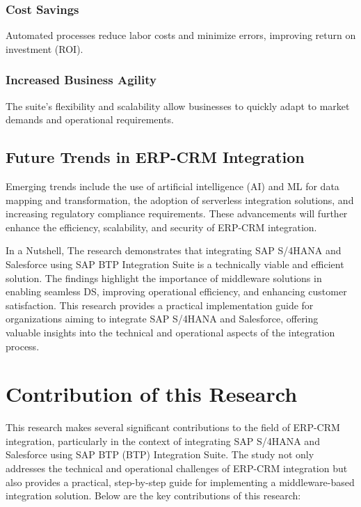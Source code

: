 \subsubsection{Cost Savings}
Automated processes reduce labor costs and minimize errors, improving return on investment (ROI).

\subsubsection{Increased Business Agility}
The suite's flexibility and scalability allow businesses to quickly adapt to market demands and operational requirements.

\subsection{Future Trends in ERP-CRM Integration}
Emerging trends include the use of artificial intelligence (AI) and ML for data mapping and transformation, the adoption of serverless integration solutions, and increasing regulatory compliance requirements. These advancements will further enhance the efficiency, scalability, and security of ERP-CRM integration.

In a Nutshell, The research demonstrates that integrating SAP S/4HANA and Salesforce using SAP BTP Integration Suite is a technically viable and efficient solution. The findings highlight the importance of middleware solutions in enabling seamless DS, improving operational efficiency, and enhancing customer satisfaction. This research provides a practical implementation guide for organizations aiming to integrate SAP S/4HANA and Salesforce, offering valuable insights into the technical and operational aspects of the integration process.



\section{Contribution of this Research}

This research makes several significant contributions to the field of ERP-CRM integration, particularly in the context of integrating SAP S/4HANA and Salesforce using SAP BTP (BTP) Integration Suite. The study not only addresses the technical and operational challenges of ERP-CRM integration but also provides a practical, step-by-step guide for implementing a middleware-based integration solution. Below are the key contributions of this research:

